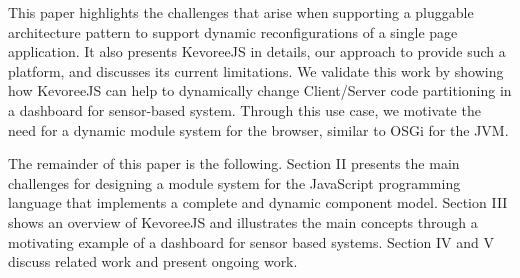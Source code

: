 This paper highlights the challenges that arise when supporting a pluggable architecture pattern to support dynamic reconfigurations of a single page application. It also presents KevoreeJS in details, our approach to provide such a platform, and discusses its current limitations. We validate this work by showing how KevoreeJS can help to dynamically change Client/Server code partitioning in a dashboard for sensor-based system. Through this use case, we motivate the need for a dynamic module system for the browser, similar to OSGi for the JVM.  

\enlargethispage{0.5cm}

The remainder of this paper is the following. Section II presents the main challenges for designing a module system for the JavaScript programming language that implements a complete and dynamic component model. Section III shows an overview of KevoreeJS and illustrates the main concepts through a motivating example of a dashboard for sensor based systems. Section IV and V discuss related work and present ongoing work. 
